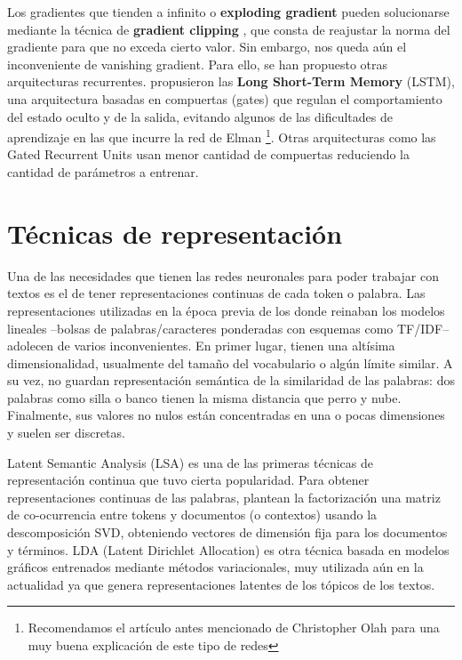 Los gradientes que tienden a infinito o \textbf{exploding gradient} pueden solucionarse mediante la técnica de \textbf{gradient clipping} \cite{goodfellow2016deep}, que consta de reajustar la norma del gradiente para que no exceda cierto valor. Sin embargo, nos queda aún el inconveniente de vanishing gradient. Para ello, se han propuesto otras arquitecturas recurrentes. \citet{hochreiter1997long} propusieron las \textbf{Long Short-Term Memory} (LSTM), una arquitectura basadas en compuertas (gates) que regulan el comportamiento del estado oculto y de la salida, evitando algunos de las dificultades de aprendizaje en las que incurre la red de Elman \footnote{Recomendamos el artículo antes mencionado de Christopher Olah para una muy buena explicación de este tipo de redes}. Otras arquitecturas como las Gated Recurrent Units \cite{cho-etal-2014-learning} usan menor cantidad de compuertas reduciendo la cantidad de parámetros a entrenar.

\section{Técnicas de representación}
\label{sec:02_representaciones}

Una de las necesidades que tienen las redes neuronales para poder trabajar con textos es el de tener representaciones continuas de cada token o palabra. Las representaciones utilizadas en la época previa de los donde reinaban los modelos lineales --bolsas de palabras/caracteres ponderadas con esquemas como TF/IDF-- adolecen de varios inconvenientes. En primer lugar, tienen una altísima dimensionalidad, usualmente del tamaño del vocabulario o algún límite similar. A su vez, no guardan representación semántica de la similaridad de las palabras: dos palabras como silla o banco tienen la misma distancia que perro y nube. Finalmente, sus valores no nulos están concentradas en una o pocas dimensiones y suelen ser discretas.

Latent Semantic Analysis (LSA) \cite{landauer1997solution} es una de las primeras técnicas de representación continua que tuvo cierta popularidad. Para obtener representaciones continuas de las palabras, plantean la factorización una matriz de co-ocurrencia entre tokens y documentos (o contextos) usando la descomposición SVD, obteniendo vectores de dimensión fija para los documentos y términos. LDA (Latent Dirichlet Allocation) \cite{blei2003latent} es otra técnica basada en modelos gráficos entrenados mediante métodos variacionales, muy utilizada aún en la actualidad ya que genera representaciones latentes de los tópicos de los textos.

